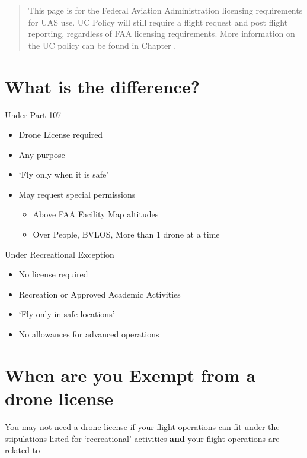 \documentclass[
]{book}
\providecommand{\tightlist}{%
  \setlength{\itemsep}{0pt}\setlength{\parskip}{0pt}}
\begin{document}
\begin{quote}
This page is for the Federal Aviation Administration licensing requirements for UAS use. UC Policy will still require a flight request and post flight reporting, regardless of FAA licensing requirements. More information on the UC policy can be found in Chapter .
\end{quote}

\hypertarget{what-is-the-difference}{%
\section{What is the difference?}\label{what-is-the-difference}}

Under Part 107

\begin{itemize}
\tightlist
\item
  Drone License required
\item
  Any purpose
\item
  `Fly only when it is safe'
\item
  May request special permissions

  \begin{itemize}
  \tightlist
  \item
    Above FAA Facility Map altitudes
  \item
    Over People, BVLOS, More than 1 drone at a time
  \end{itemize}
\end{itemize}

Under Recreational Exception

\begin{itemize}
\tightlist
\item
  No license required
\item
  Recreation or Approved Academic Activities
\item
  `Fly only in safe locations'
\item
  No allowances for advanced operations
\end{itemize}

\hypertarget{when-are-you-exempt-from-a-drone-license}{%
\section{When are you Exempt from a drone license}\label{when-are-you-exempt-from-a-drone-license}}

You may not need a drone license if your flight operations can fit under the stipulations listed for `recreational' activities \textbf{and} your flight operations are related to
\end{document}
